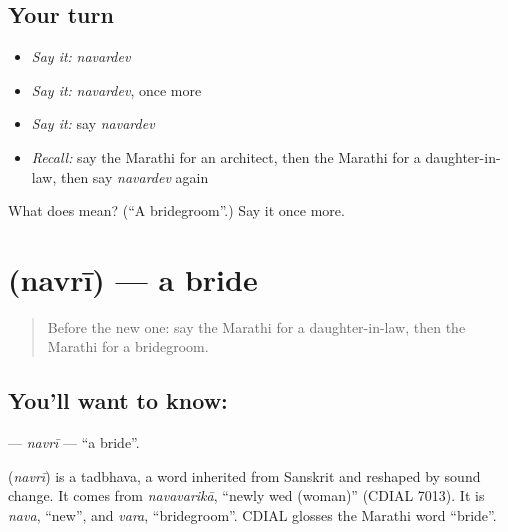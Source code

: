 \subsection*{Your turn}
\begin{itemize}
\raggedright
  \item \emph{Say it:} \emph{navardev}
  \item \emph{Say it:} \emph{navardev}, once more
  \item \emph{Say it:} say \emph{navardev}
  \item \emph{Recall:} say the Marathi for an architect, then the Marathi for a daughter-in-law, then say \emph{navardev} again
\end{itemize}

\begin{tcolorbox}[breakable,colback=teal!4,colframe=teal!35!black,title={Before you move on}]
What does  mean? (\textquotedblleft{}A bridegroom\textquotedblright{}.) Say it once more.
\end{tcolorbox}
\section[\texorpdfstring{\mr{नवरी} (navrī)}{नवरी (navrī)}]{ (navrī) — a bride}

\label{lesson:MR-C181-navri}



\begin{quote}
Before the new one: say the Marathi for a daughter-in-law, then the Marathi for a bridegroom.
\end{quote}

\subsection*{You'll want to know: }
\textbf{} — \emph{navrī} — \textquotedblleft{}a bride\textquotedblright{}.

\begin{cousinweb}
\textbf{} (\emph{navrī}) is a tadbhava, a word inherited from Sanskrit and reshaped by sound change. It comes from \emph{navavarikā}, \textquotedblleft{}newly wed (woman)\textquotedblright{} (CDIAL 7013). It is \emph{nava}, \textquotedblleft{}new\textquotedblright{}, and \emph{vara}, \textquotedblleft{}bridegroom\textquotedblright{}. CDIAL glosses the Marathi word \textquotedblleft{}bride\textquotedblright{}.
\end{cousinweb}

